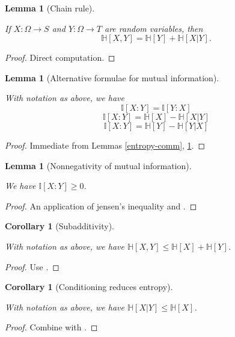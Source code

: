 \documentclass[10pt,a4paper]{article}
\newtheorem{lemma}[theorem]{Lemma}
\newtheorem{corollary}[theorem]{Corollary}
\newcommand{\lean}[1]{}
\newcommand{\uses}[1]{}
\newcommand{\leanok}{}
\newcommand{\bbH}{\mathbb{H}}
\newcommand{\bbI}{\mathbb{I}}
\begin{document}
\begin{lemma}[Chain rule]\label{chain-rule}
  \uses{conditional-entropy-def}
  \lean{ProbabilityTheory.chain_rule, ProbabilityTheory.chain_rule'}
  \leanok
  If $X: \Omega \to S$ and $Y: \Omega \to T$ are random variables, then
  $$ \bbH[X, Y] = \bbH[Y] + \bbH[X|Y].$$
  \end{lemma}
  \begin{proof}
  \leanok
  Direct computation.
\end{proof}


\begin{lemma}[Alternative formulae for mutual information]
  \label{alternative-mutual}
  \uses{information-def}
  \lean{ProbabilityTheory.mutualInfo_comm, ProbabilityTheory.mutualInfo_eq_entropy_sub_condEntropy}
  \leanok
  With notation as above, we have
  $$  \bbI[X : Y] = \bbI[Y:X]$$
  $$  \bbI[X : Y] = \bbH[X] - \bbH[X|Y]$$
  $$  \bbI[X : Y] = \bbH[Y] - \bbH[Y|X]$$
\end{lemma}

\begin{proof}
  \uses{entropy-comm,chain-rule}
  \leanok
  Immediate from Lemmas \ref{entropy-comm}, \ref{chain-rule}.
\end{proof}

\begin{lemma}[Nonnegativity of mutual information]
  \label{mutual-nonneg}
  \lean{ProbabilityTheory.mutualInfo_nonneg}
  \leanok
  We have $\bbI[X:Y] \geq 0$.
\end{lemma}

\begin{proof}
  \uses{concave, alternative-mutual}
  \leanok

  An application of jensen's inequality and .
\end{proof}

\begin{corollary}[Subadditivity]
  \label{subadditive}
  \lean{ProbabilityTheory.entropy_pair_le_add}
  \leanok
  With notation as above, we have $\bbH[X,Y] \leq \bbH[X] + \bbH[Y]$.
\end{corollary}

\begin{proof}
  \uses{mutual-nonneg, alternative-mutual}
  \leanok
  Use .
\end{proof}

\begin{corollary}[Conditioning reduces entropy]
  \label{cond-reduce}
  \lean{ProbabilityTheory.condEntropy_le_entropy}
  \leanok
  With notation as above, we have $\bbH[X|Y] \leq \bbH[X]$.
\end{corollary}
\begin{proof}
  \uses{mutual-nonneg, alternative-mutual}
  \leanok
  Combine  with .
\end{proof}
\end{document}
